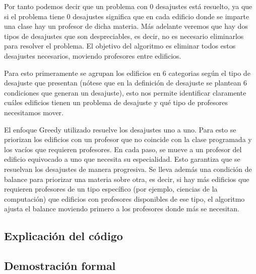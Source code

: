 \documentclass[11pt]{article}
\begin{document}
    Por tanto podemos decir que un problema con 0 desajustes está resuelto, ya que si el problema tiene
    0 desajustes significa que en cada edificio donde se imparte una clase hay un profesor de dicha materia.
    Más adelante veremos que hay dos tipos de desajustes que son despreciables, es decir, no es necesario
    eliminarlos para resolver el problema. El objetivo del algoritmo es eliminar todos estos desajustes necesarios, 
    moviendo profesores entre edificios.

    Para esto primeramente se agrupan los edificios en 6 categorias según el tipo de desajuste que presentan
    (nótese que en la definición de desajuste se plantean 6 condiciones que generan un desajuste), esto nos 
    permite identificar claramente cuáles edificios tienen un problema de desajuste y qué tipo de profesores 
    necesitamos mover.

    El enfoque Greedy utilizado resuelve los desajustes uno a uno. Para esto se priorizan los edificios con un 
    profesor que no coincide con la clase programada y los vacíos que requieren profesores. En cada paso, se mueve 
    a un profesor del edificio equivocado a uno que necesita su especialidad. Esto garantiza que se resuelvan los 
    desajustes de manera progresiva. Se lleva además una condición de balance para priorizar una materia sobre otra, 
    es decir, si hay más edificios que requieren profesores de un tipo específico (por ejemplo, ciencias de la 
    computación) que edificios con profesores disponibles de ese tipo, el algoritmo ajusta el balance moviendo primero 
    a los profesores donde más se necesitan.

    \subsection{Explicación del código}

    \subsection{Demostración formal}
    
\end{document}

